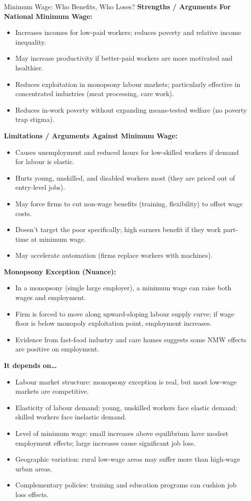 \documentclass[11pt, a4paper, twoside]{book}
\begin{document}
\begin{evaluation}{Minimum Wage: Who Benefits, Who Loses?}
\textbf{Strengths / Arguments For National Minimum Wage:}
\begin{itemize}[leftmargin=*, nosep]
\item Increases incomes for low-paid workers; reduces poverty and relative income inequality.
\item May increase productivity if better-paid workers are more motivated and healthier.
\item Reduces exploitation in monopsony labour markets; particularly effective in concentrated industries (meat processing, care work).
\item Reduces in-work poverty without expanding means-tested welfare (no poverty trap stigma).
\end{itemize}
\textbf{Limitations / Arguments Against Minimum Wage:}
\begin{itemize}[leftmargin=*, nosep]
\item Causes unemployment and reduced hours for low-skilled workers if demand for labour is elastic.
\item Hurts young, unskilled, and disabled workers most (they are priced out of entry-level jobs).
\item May force firms to cut non-wage benefits (training, flexibility) to offset wage costs.
\item Doesn't target the poor specifically; high earners benefit if they work part-time at minimum wage.
\item May accelerate automation (firms replace workers with machines).
\end{itemize}
\textbf{Monopsony Exception (Nuance):}
\begin{itemize}[leftmargin=*, nosep]
\item In a monopsony (single large employer), a minimum wage can raise both wages and employment.
\item Firm is forced to move along upward-sloping labour supply curve; if wage floor is below monopoly exploitation point, employment increases.
\item Evidence from fast-food industry and care homes suggests some NMW effects are positive on employment.
\end{itemize}
\textbf{It depends on\ldots}
\begin{itemize}[leftmargin=*, nosep]
\item Labour market structure: monopsony exception is real, but most low-wage markets are competitive.
\item Elasticity of labour demand: young, unskilled workers face elastic demand; skilled workers face inelastic demand.
\item Level of minimum wage: small increases above equilibrium have modest employment effects; large increases cause significant job loss.
\item Geographic variation: rural low-wage areas may suffer more than high-wage urban areas.
\item Complementary policies: training and education programs can cushion job loss effects.
\end{itemize}
\end{evaluation}
\end{document}
